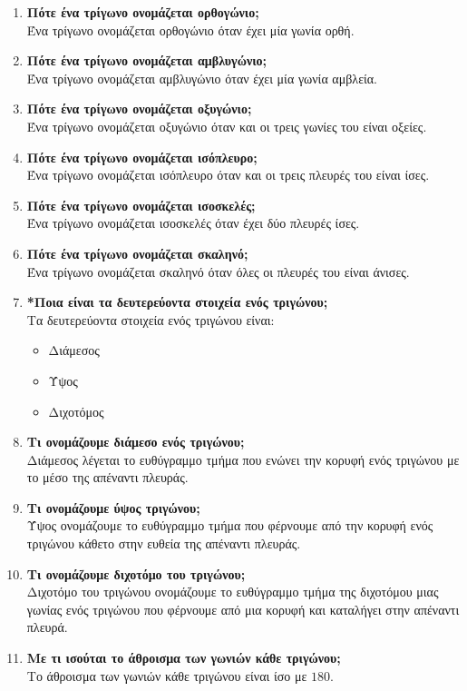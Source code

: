 \documentclass[a4paper,11pt]{report}
\begin{document}
\begin{enumerate}
\item \textbf{Πότε ένα τρίγωνο ονομάζεται ορθογώνιο;}\\
      Ένα τρίγωνο ονομάζεται ορθογώνιο όταν έχει μία γωνία ορθή.
\item \textbf{Πότε ένα τρίγωνο ονομάζεται αμβλυγώνιο;}\\
       Ένα τρίγωνο ονομάζεται αμβλυγώνιο όταν έχει μία γωνία αμβλεία.
\item \textbf{Πότε ένα τρίγωνο ονομάζεται οξυγώνιο;}\\
       Ένα τρίγωνο ονομάζεται οξυγώνιο όταν και οι τρεις γωνίες του είναι οξείες.
\item \textbf{Πότε ένα τρίγωνο ονομάζεται ισόπλευρο;}\\
       Ένα τρίγωνο ονομάζεται ισόπλευρο όταν και οι τρεις πλευρές του είναι ίσες.
\item \textbf{Πότε ένα τρίγωνο ονομάζεται ισοσκελές;}\\
       Ένα τρίγωνο ονομάζεται ισοσκελές όταν έχει δύο πλευρές ίσες.
\item \textbf{Πότε ένα τρίγωνο ονομάζεται σκαληνό;}\\
       Ένα τρίγωνο ονομάζεται σκαληνό όταν όλες οι πλευρές του είναι άνισες.
\item \textbf{*Ποια είναι τα δευτερεύοντα στοιχεία ενός τριγώνου;}\\
      Τα δευτερεύοντα στοιχεία ενός τριγώνου είναι:
      \begin{itemize}
       \item Διάμεσος 
       \item Ύψος
       \item Διχοτόμος
      \end{itemize}

\item \textbf{Τι ονομάζουμε διάμεσο ενός τριγώνου;}\\
      Διάμεσος λέγεται το ευθύγραμμο τμήμα που ενώνει την κορυφή ενός τριγώνου με το μέσο της απέναντι πλευράς.
\item \textbf{Τι ονομάζουμε ύψος τριγώνου;}\\
      Ύψος ονομάζουμε το ευθύγραμμο τμήμα που φέρνουμε από την κορυφή ενός τριγώνου κάθετο στην ευθεία της 
      απέναντι πλευράς.
\item \textbf{Τι ονομάζουμε διχοτόμο του τριγώνου;}\\
      Διχοτόμο του τριγώνου ονομάζουμε το ευθύγραμμο τμήμα της διχοτόμου  μιας γωνίας ενός τριγώνου που φέρνουμε 
      από μια κορυφή και καταλήγει στην απέναντι πλευρά.
\item \textbf{Με τι ισούται το άθροισμα των γωνιών κάθε τριγώνου;}\\
      Το άθροισμα των γωνιών κάθε τριγώνου είναι ίσο με $180$\textdegree.
\end{enumerate}
\end{document}

